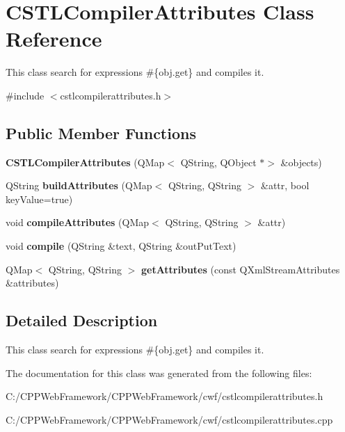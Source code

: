 \hypertarget{class_c_s_t_l_compiler_attributes}{}\section{C\+S\+T\+L\+Compiler\+Attributes Class Reference}
\label{class_c_s_t_l_compiler_attributes}


This class search for expressions \#\{obj.\+get\} and compiles it.  




{\ttfamily \#include $<$cstlcompilerattributes.\+h$>$}

\subsection*{Public Member Functions}
\begin{DoxyCompactItemize}
\item 
\mbox{\label{class_c_s_t_l_compiler_attributes_a1c632f803e86b254d3997a670ab8d185}} 
{\bfseries C\+S\+T\+L\+Compiler\+Attributes} (Q\+Map$<$ Q\+String, Q\+Object $\ast$$>$ \&objects)
\item 
\mbox{\label{class_c_s_t_l_compiler_attributes_a68ca7d9d8ef45dd5f51a0977fb8df911}} 
Q\+String {\bfseries build\+Attributes} (Q\+Map$<$ Q\+String, Q\+String $>$ \&attr, bool key\+Value=true)
\item 
\mbox{\label{class_c_s_t_l_compiler_attributes_a1376447033a4bfcceb1b1d27935d6d06}} 
void {\bfseries compile\+Attributes} (Q\+Map$<$ Q\+String, Q\+String $>$ \&attr)
\item 
\mbox{\label{class_c_s_t_l_compiler_attributes_a63a271e6d97a614a02cd692c8a1f6395}} 
void {\bfseries compile} (Q\+String \&text, Q\+String \&out\+Put\+Text)
\item 
\mbox{\label{class_c_s_t_l_compiler_attributes_aaccef26836cdd8e2c7974b1a1e70b6c0}} 
Q\+Map$<$ Q\+String, Q\+String $>$ {\bfseries get\+Attributes} (const Q\+Xml\+Stream\+Attributes \&attributes)
\end{DoxyCompactItemize}


\subsection{Detailed Description}
This class search for expressions \#\{obj.\+get\} and compiles it. 

The documentation for this class was generated from the following files\+:\begin{DoxyCompactItemize}
\item 
C\+:/\+C\+P\+P\+Web\+Framework/\+C\+P\+P\+Web\+Framework/cwf/cstlcompilerattributes.\+h\item 
C\+:/\+C\+P\+P\+Web\+Framework/\+C\+P\+P\+Web\+Framework/cwf/cstlcompilerattributes.\+cpp\end{DoxyCompactItemize}

